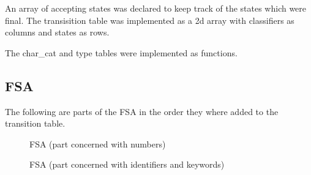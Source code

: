 \documentclass[a4paper, 12pt]{article}
\begin{document}
An array of accepting states was declared to keep track of the states which were final.
The transisition table was implemented as a 2d array with classifiers as columns and states as rows.

The char\_cat and type tables were implemented as functions.

\subsection{FSA}

The following are parts of the FSA in the order they where added to the transition table.

\begin{figure}[h]
    \centering
    \caption{FSA (part concerned with numbers)}
\end{figure}

\begin{figure}[h]
    \centering
    \caption{FSA (part concerned with identifiers and keywords)}
\end{figure}
\end{document}

